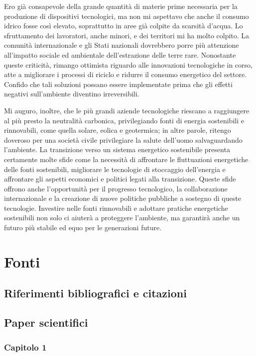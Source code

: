 \documentclass[12pt,a4paper,oneside]{book}
\begin{document}
Ero già consapevole della grande quantità di materie prime necessaria per la produzione di dispositivi tecnologici, ma non mi aspettavo che anche il consumo idrico fosse così elevato, soprattutto in aree già colpite da scarsità d'acqua. 
Lo sfruttamento dei lavoratori, anche minori, e dei territori mi ha molto colpito. La comunità internazionale e gli Stati nazionali dovrebbero porre più attenzione all'impatto sociale ed ambientale dell'estrazione delle terre rare.
Nonostante queste criticità, rimango ottimista riguardo alle innovazioni tecnologiche in corso, atte a migliorare i processi di riciclo e ridurre il consumo energetico del settore. Confido che tali soluzioni possano essere implementate prima che gli effetti negativi sull'ambiente diventino irreversibili.

Mi auguro, inoltre, che le più grandi aziende tecnologiche riescano a raggiungere al più presto la neutralità carbonica, privilegiando fonti di energia sostenibili e rinnovabili, come quella solare, eolica e geotermica; in altre parole, ritengo doveroso per una società civile privilegiare la salute dell'uomo salvaguardando l'ambiente. La transizione verso un sistema energetico sostenibile presenta certamente molte sfide come la necessità di affrontare le fluttuazioni energetiche delle fonti sostenibili, migliorare le tecnologie di stoccaggio dell'energia e affrontare gli aspetti economici e politici legati alla transizione.
Queste sfide offrono anche l'opportunità per il progresso tecnologico, la collaborazione internazionale e la creazione di nuove politiche pubbliche a sostegno di queste tecnologie. Investire nelle fonti rinnovabili e adottare pratiche energetiche sostenibili non solo ci aiuterà a proteggere l'ambiente, ma garantirà anche un futuro più stabile ed equo per le generazioni future.

\newpage

\chapter*{Fonti}
\renewcommand{\bibsection}{}
\section*{Riferimenti bibliografici e citazioni}
\nocite{*}


\section*{Paper scientifici}
\subsection*{Capitolo 1}
\sloppy
\end{document}
